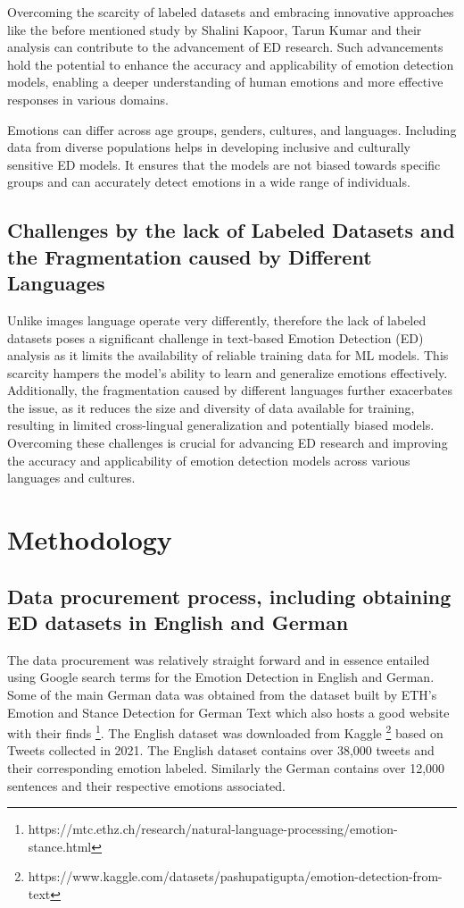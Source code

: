 \documentclass[11pt]{article}
\begin{document}
Overcoming the scarcity of labeled datasets and embracing innovative approaches like the before mentioned study by Shalini Kapoor, Tarun Kumar \cite{KAPOOR2023120882} and their analysis can contribute to the advancement of ED research. Such advancements hold the potential to enhance the accuracy and applicability of emotion detection models, enabling a deeper understanding of human emotions and more effective responses in various domains.

Emotions can differ across age groups, genders, cultures, and languages. Including data from diverse populations helps in developing inclusive and culturally sensitive ED models. It ensures that the models are not biased towards specific groups and can accurately detect emotions in a wide range of individuals.

\subsection{Challenges by the lack of Labeled Datasets and the Fragmentation caused by Different Languages}
Unlike images language operate very differently, therefore the lack of labeled datasets poses a significant challenge in text-based Emotion Detection (ED) analysis as it limits the availability of reliable training data for ML models. This scarcity hampers the model's ability to learn and generalize emotions effectively. Additionally, the fragmentation caused by different languages further exacerbates the issue, as it reduces the size and diversity of data available for training, resulting in limited cross-lingual generalization and potentially biased models. Overcoming these challenges is crucial for advancing ED research and improving the accuracy and applicability of emotion detection models across various languages and cultures.

\section{Methodology}

\subsection{Data procurement process, including obtaining ED datasets in English and German}
\label{sec:data-procurement-process}
The data procurement was relatively straight forward and in essence entailed using Google search terms for the Emotion Detection in English and German. Some of the main German data was obtained from the dataset built by ETH's Emotion and Stance Detection for German Text \cite{mascarell-etal-2021-stance} which also hosts a good website with their finds \footnote{https://mtc.ethz.ch/research/natural-language-processing/emotion-stance.html}. The English dataset was downloaded from Kaggle \footnote{https://www.kaggle.com/datasets/pashupatigupta/emotion-detection-from-text} based on Tweets collected in 2021. The English dataset contains over 38,000 tweets and their corresponding emotion labeled. Similarly the German contains over 12,000 sentences and their respective emotions associated.
\end{document}
